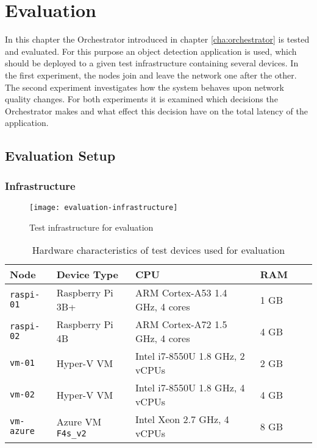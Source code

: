 \chapter{Evaluation\label{cha:evaluation}}

In this chapter the Orchestrator introduced in chapter \ref{cha:orchestrator} is tested and evaluated. For this purpose an object detection application is used, which should be deployed to a given test infrastructure containing several devices.
In the first experiment, the nodes join and leave the network one after the other.
The second experiment investigates how the system behaves upon network quality changes.
For both experiments it is examined which decisions the Orchestrator makes and what effect this decision have on the total latency of the application.







\section{Evaluation Setup}

\subsection{Infrastructure\label{sec:eval-infrastructure}}

\begin{figure}[htb]
    \centering
    \texttt{[image: evaluation-infrastructure]}
    \caption{Test infrastructure for evaluation}
    \label{fig:evaluation-infrastructure}
\end{figure}

\begin{table}[htb]
    \centering
    \begin{tabular}{|l|l|l|l|l|l|}
    \hline
        \textbf{Node} & \textbf{Device Type} & \textbf{CPU} & \textbf{RAM} \\
         \hline
         \texttt{raspi-01} & Raspberry Pi 3B+ & ARM Cortex-A53 1.4 GHz, 4 cores & 1 GB\\
         \hline
         \texttt{raspi-02} & Raspberry Pi 4B & ARM Cortex-A72 1.5 GHz, 4 cores & 4 GB\\
         \hline
         \texttt{vm-01} & Hyper-V VM & Intel i7-8550U 1.8 GHz, 2 vCPUs & 2 GB\\
         \hline
         \texttt{vm-02} & Hyper-V VM & Intel i7-8550U 1.8 GHz, 4 vCPUs & 4 GB\\
         \hline
         \texttt{vm-azure} & Azure VM \texttt{F4s\_v2} & Intel Xeon 2.7 GHz, 4 vCPUs & 8 GB\\
         \hline
    \end{tabular}
    \caption{Hardware characteristics of test devices used for evaluation}
    \label{tab:evaluation-devices}
\end{table}

